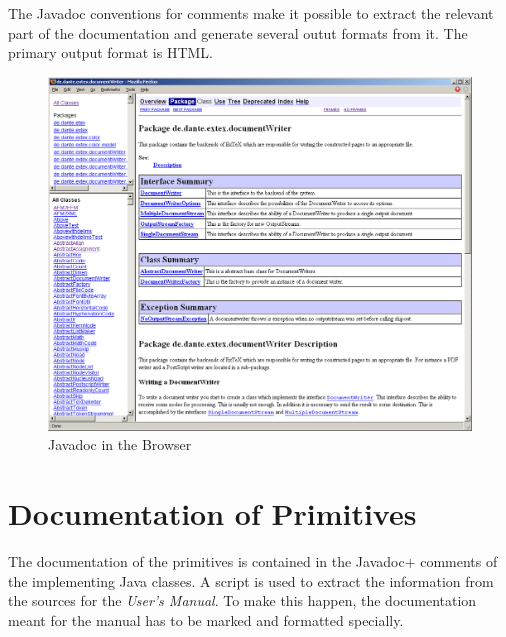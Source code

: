 The Javadoc conventions for comments make it possible to extract the
relevant part of the documentation and generate several outut formats
from it. The primary output format is HTML.
\begin{figure}[tbh]
  \centering
  \includegraphics[scale=.33]{image/javadoc}
  \caption{Javadoc in the Browser}\label{fig:eclipse-javadoc}
\end{figure}


\section{Documentation of Primitives}

The documentation of the primitives is contained in the \+Javadoc+
comments of the implementing Java classes. A script is used to extract
the information from the sources for the \textit{User's Manual}. To
make this happen, the documentation meant for the manual has to be
marked and formatted specially.

\INCOMPLETE


